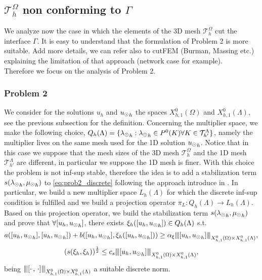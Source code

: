 \subsection{$\mathcal{T}^{\Omega}_h$ non conforming to $\Gamma$}
We analyze now the case in which the elements of the 3D mesh $\mathcal{T}^{\Omega}_h$ cut the interface $\Gamma$. It is easy to understand that the formulation of Problem 2 is more suitable. 
{\color{red} Add more details, we can refer also to cutFEM (Burman, Massing etc.) explaining the limitation of that approach (network case for example).}\\
Therefore we focus on the analysis of Problem 2.

\subsubsection{Problem 2} We consider for the solutions $u_h$ and ${u_{\odot}}_h$ the spaces $X^0_{h,1}(\Omega)$ and $X^0_{h,1}(\Lambda)$, see the previous subsection for the definition. Concerning the multiplier space, we make the following choice, $Q_h(\Lambda)=\{{\lambda_{\odot}}_h : {\lambda_{\odot}}_h \in P^0(K) \forall K \in \mathcal{T}^{\Lambda}_{h'}\}$, namely the multiplier lives on the same mesh used for the 1D solution ${u_{\odot}}_h$. Notice that in this case we suppose that the mesh sizes of the 3D mesh $	\mathcal{T}^{\Omega}_h$ and the 1D mesh $\mathcal{T}^{\Lambda}_{h'}$ are different, in particular we suppose the 1D mesh is finer. With this choice the problem is not inf-sup stable, therefore the idea is to add a stabilization term $s({\lambda_{\odot}}_h, {\mu_{\odot}}_h)$ to \eqref{eq:prob2_discrete} following the approach introduce in \cite{burman2014}. In particular, we build a new multiplier space $L_h(\Lambda)$ for which the discrete inf-sup condition is fulfilled and we build a projection operator $\pi_L: Q_h(\Lambda) \rightarrow L_h(\Lambda)$. Based on this projection operator, we build the stabilization term $s({\lambda_{\odot}}_h, {\mu_{\odot}}_h)$ and prove that $\forall [u_h, {u_{\odot}}_h]$, there exists $\xi_h([u_h, {u_{\odot}}_h]) \in Q_h(\Lambda)$ s.t.  
\begin{equation}\label{stab_coercivity}
a([u_h, {\ud}_h],[u_h, {\ud}_h] ) + b([u_h, {\ud}_h], \xi_h([u_h, {\ud}_h])) \geq \alpha_\xi \vertiii{[u_h, {\ud}_h]}_{X^0_{h,1}(\Omega)\times X^0_{h,1}(\Lambda) },
\end{equation}
\begin{equation}\label{stab_stability}
(s(\xi_{h}, \xi_{h}))^{\frac 12} \leq c_s \vertiii{[u_h, {\ud}_h]}_{X^0_{h,1}(\Omega)\times X^0_{h,1}(\Lambda) },
\end{equation}
being ${\left\vert\kern-0.25ex\left\vert\kern-0.25ex\left\vert [\cdot \, ,\, \cdot]  \right\vert\kern-0.25ex\right\vert\kern-0.25ex\right\vert}_{X^0_{h,1}(\Omega)\times X^0_{h,1}(\Lambda) }$ a suitable discrete norm. \\

